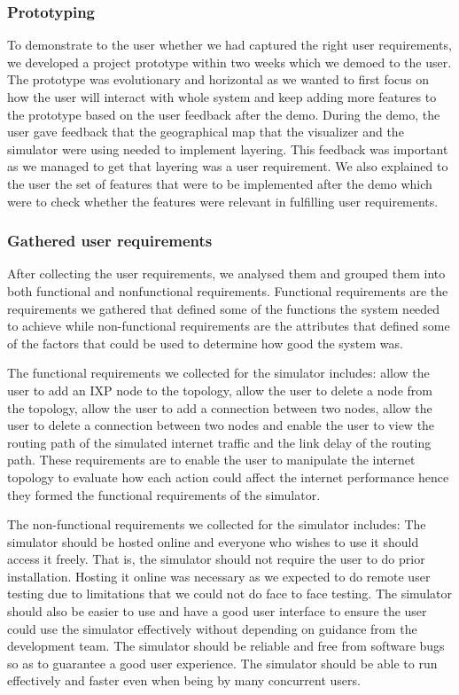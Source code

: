 \subsubsection{Prototyping}
To demonstrate to the user whether we had captured the right user requirements, we developed a project prototype within two weeks which we demoed to the user. The prototype was evolutionary and horizontal as we wanted to first focus on how the user will interact with whole system and keep adding more features to the prototype based on the user feedback after the demo. During the demo, the user gave feedback that the geographical map that the visualizer and the simulator were using needed to implement layering. This feedback was important as we managed to get that layering was a user requirement. We also explained to the user the set of features that were to be implemented after the demo which were to check whether the features were relevant in fulfilling user requirements.   
\subsubsection{Gathered user requirements}
After collecting the user requirements, we analysed them and grouped them into both functional and nonfunctional requirements. Functional requirements are the requirements we gathered that defined some of the functions the system needed to achieve while non-functional requirements are the attributes that defined some of the factors that could be used to determine how good the system was. 

The functional requirements we collected for the simulator includes: allow the user to add an IXP node to the topology, allow the user to delete a node from the topology, allow the user to add a connection between two nodes, allow the user to delete a connection between two nodes and enable the user to view the routing path of the simulated internet traffic and the link delay of the routing path. These requirements are to enable the user to manipulate the internet topology to evaluate how each action could affect the internet performance hence they formed the functional requirements of the simulator. 


The non-functional requirements we collected for the simulator includes: The simulator should be hosted online and everyone who wishes to use it should access it freely. That is, the simulator should not require the user to do prior installation. Hosting it online was necessary as we expected to do remote user testing due to limitations that we could not do face to face testing. The simulator should also be easier to use and have a good user interface to ensure the user could use the simulator effectively without depending on guidance from the development team. The simulator should be reliable and free from software bugs so as to guarantee a good user experience. The simulator should be able to run effectively and faster even when being by many concurrent users. 



